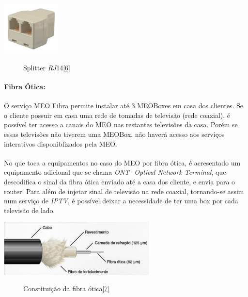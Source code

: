 \documentclass{report}
\begin{document}
\begin{center}
\includegraphics[width=3cm]{Splitter_RJ14.pdf} 
\begin{figure}[h]
\caption{Splitter \textit{RJ}14\href{https://i.ebayimg.com/images/g/CtUAAOSwaNBUg8Aj/s-l300.jpg}{[6]}}
\end{figure}
\end{center}

\paragraph{Fibra Ótica:}

\paragraph{}O serviço MEO Fibra permite instalar até 3 MEOBoxes em casa dos clientes. Se o cliente possuir em casa uma rede de tomadas de televisão (rede coaxial), é possível ter acesso a canais do MEO nas restantes televisões da casa. Porém se essas televisões não tiverem uma MEOBox, não haverá acesso aos serviços interativos disponiblizados pela MEO.

\paragraph{}No que toca a equipamentos no caso do MEO por fibra ótica, é acresentado um equipamento adicional que se chama \textit{ONT- Optical Network Terminal}, que descodifica o sinal da fibra ótica enviado até a casa dos cliente, e envia para o router. Para além de injetar sinal de televisão na rede coaxial, tornando-se assim num serviço de \textit{IPTV}, é possível deixar a necessidade de ter uma box por cada televisão de lado.

\begin{center}
\includegraphics[width=8cm]{fibra_otica.pdf} 
\begin{figure}[h]
\caption{Constituição da fibra ótica\href{http://www.projetoderedes.com.br/artigos/imagens/Image9.png}{[7]}}
\end{figure}
\end{center}
\end{document}
